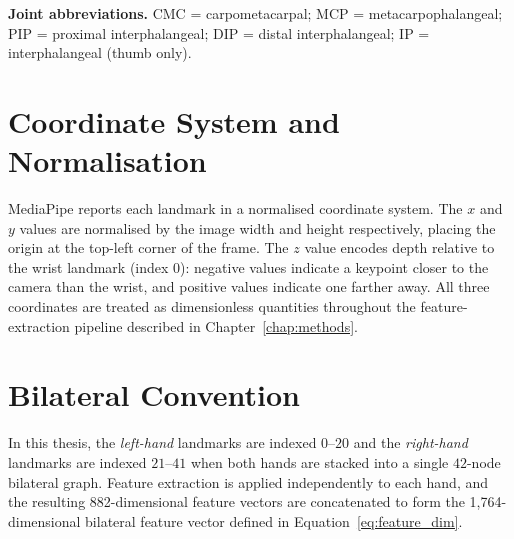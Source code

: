 \noindent
\textbf{Joint abbreviations.} CMC = carpometacarpal; MCP = metacarpophalangeal; PIP = proximal interphalangeal; DIP = distal interphalangeal; IP = interphalangeal (thumb only).

\section{Coordinate System and Normalisation}

MediaPipe reports each landmark in a normalised coordinate system. The $x$ and $y$ values are normalised by the image width and height respectively, placing the origin at the top-left corner of the frame. The $z$ value encodes depth relative to the wrist landmark (index 0): negative values indicate a keypoint closer to the camera than the wrist, and positive values indicate one farther away. All three coordinates are treated as dimensionless quantities throughout the feature-extraction pipeline described in Chapter~\ref{chap:methods}.

\section{Bilateral Convention}

In this thesis, the \emph{left-hand} landmarks are indexed $0$--$20$ and the \emph{right-hand} landmarks are indexed $21$--$41$ when both hands are stacked into a single $42$-node bilateral graph. Feature extraction is applied independently to each hand, and the resulting 882-dimensional feature vectors are concatenated to form the 1,764-dimensional bilateral feature vector defined in Equation~\eqref{eq:feature_dim}.
